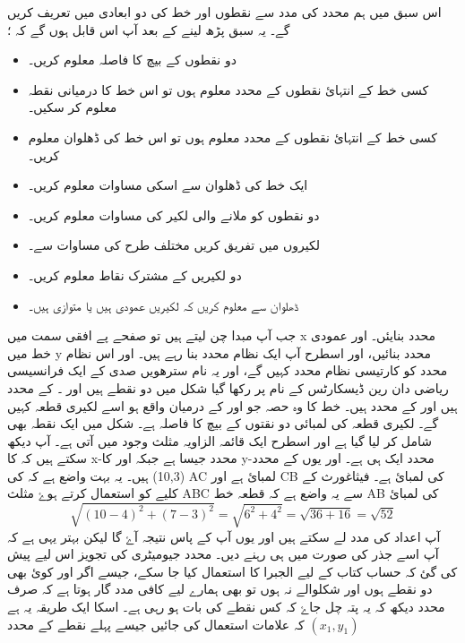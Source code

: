  اس سبق میں ہم محدد کی مدد سے نقطوں اور خط کی   دو ابعادی میں تعریف کریں گے۔ یہ سبق پڑھ لینے کے بعد آپ اس قابل ہوں گے کہ ؛
\begin{itemize}
\item   
دو نقطوں کے بیچ کا فاصلہ معلوم کریں۔
\item
کسی خط کے انتہائ نقطوں کے محدد معلوم ہوں تو اس خط کا درمیانی نقطہ معلوم کر سکیں۔
\item
کسی خط کے انتہائ نقطوں کے محدد معلوم ہوں تو اس خط کی ڈھلوان معلوم کریں۔
\item
ایک خط کی ڈھلوان سے اسکی مساوات معلوم کریں۔
\item
دو نقطوں کو ملانے والی لکیر کی مساوات معلوم کریں۔
\item
لکیروں میں تفریق کریں مختلف طرح کی مساوات سے۔
\item
دو لکیریں کے مشترک نقاط  معلوم کریں۔
\item
ڈھلوان سے معلوم کریں کہ لکیریں عمودی ہیں یا متوازی ہیں۔ 
\end{itemize}
جب آپ مبدا چن لیتے ہیں تو صفحے پے افقی سمت میں x محدد بنایئں۔ اور عمودی خط میں y محدد بنائیں، اور اسطرح آپ ایک نظام محدد بنا رہے ہیں۔ اور اس نظام محدد کو کارتیسی نظام محدد کہیں گے، اور یہ نام سترھویں صدی کے  ایک فرانسیسی ریاضی دان رین ڈیسکارٹس  کے نام پر رکھا گیا
 شکل    میں دو نقطے ہیں   اور ۔   کے محدد  ہیں اور   کے    محدد ہیں۔  خط کا وہ حصہ جو     اور       کے درمیان واقع ہو اسے لکیری قطعہ کہیں گے۔ لکیری قطعہ کی لمبائی  دو نقتوں کے بیچ کا فاصلہ ہے۔
شکل   میں ایک نقطہ      بھی شامل کر لیا گیا ہے اور اسطرح ایک قائمہ الزاویہ مثلث وجود میں آتی ہے۔ آپ دیکھ سکتے ہیں کہ     کا  x-محدد     جیسا ہے جبکہ     اور      کا y-محدد ایک ہی ہے۔  اور یوں  کے   محدد  (10,3) ہیں۔
یہ بہت واضع ہے کہ   کی AC لمبائ      ہے اور    CB  کی لمبائ    ہے۔ فیثاغورث کے کلیے کو استعمال کرتے ہوۓ  مثلث ABC    سے یہ واضع ہے کہ قطعہ خط  AB کی لمبائ \[ \sqrt{(10-4)^2 + (7-3)^2} = \sqrt{6^2 + 4^2} = \sqrt{36+16} = \sqrt{52}
\] 
 آپ اعداد کی مدد لے سکتے ہیں اور یوں آپ کے پاس نتیجہ      آۓ گا لیکن بہتر یہی ہے کہ آپ اسے جذر کی صورت میں ہی رہنے دیں۔
 محدد جیومیٹری کی تجویز اس لیے پیش کی گئ کہ حساب کتاب کے لیے الجبرا کا استعمال کیا جا سکے، جیسے اگر      اور      کوئ بھی دو نقطے ہوں اور شکلوالے نہ ہوں تو بھی ہمارے لیے کافی مدد گار ہوتا ہے کہ صرف محدد دیکھ کہ یہ پتہ چل جاۓ کہ کس نقطے کی بات ہو رہی ہے۔ اسکا ایک طریقہ یہ ہے کہ علامات استعمال کی جائیں جیسے پہلے نقطے کے محدد   \((x_{1},y_{1})\)
